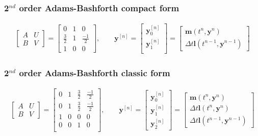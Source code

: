 \subsubsection{2$^{nd}$ order Adams-Bashforth compact form}
\begin{align*}
\left[\begin{array}{c|c}
A & U \\
\hline
B & V
\end{array}\right] =
\left[\begin{array}{c|cc}
0 & 1 & 0 \\
\hline
\frac{3}{2} & 1 & \frac{-1}{2}  \\
1 & 0 & 0
\end{array}\right],\qquad
\boldsymbol{y}^{[n]}=
\left[\begin{array}{c}
\boldsymbol{y}^{[n]}_0\\
\boldsymbol{y}^{[n]}_1\\
\end{array}\right]=
\left[\begin{array}{c}
\boldsymbol{m}\left(t^n,\boldsymbol{y}^{n}\right)\\
\Delta t \boldsymbol{l}\left(t^{n-1},\boldsymbol{y}^{n-1}\right)
\end{array}\right]
\end{align*}

\subsubsection{2$^{nd}$ order Adams-Bashforth classic form}
\begin{align*}
\left[\begin{array}{c|c}
A & U \\
\hline
B & V
\end{array}\right] =
\left[\begin{array}{c|ccc}
0 & 1 & \frac{3}{2} & \frac{-1}{2} \\
\hline
0 & 1 & \frac{3}{2} & \frac{-1}{2} \\
1 & 0 & 0 & 0 \\
0 & 0 & 1 & 0 \\
\end{array}\right],\qquad
\boldsymbol{y}^{[n]}=
\left[\begin{array}{c}
\boldsymbol{y}^{[n]}_0\\
\boldsymbol{y}^{[n]}_1\\
\boldsymbol{y}^{[n]}_2
\end{array}\right]=
\left[\begin{array}{c}
\boldsymbol{m}\left(t^n,\boldsymbol{y}^{n}\right) \\
\Delta t \boldsymbol{l}\left(t^n,\boldsymbol{y}^{n}\right)\\
\Delta t \boldsymbol{l}\left(t^{n-1},\boldsymbol{y}^{n-1}\right)
\end{array}\right]
\end{align*}

